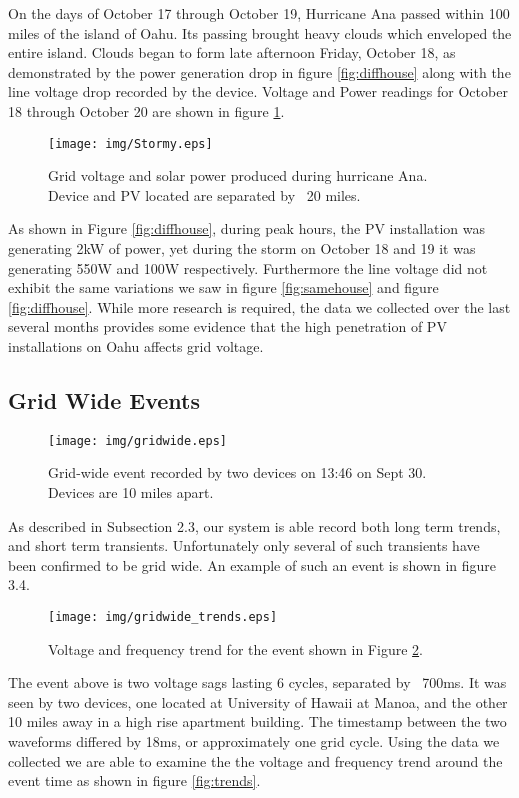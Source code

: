 On the days of October 17 through October 19, Hurricane Ana passed within 100 miles of the island of Oahu. Its passing brought heavy clouds which enveloped the entire island. Clouds began to form late afternoon Friday, October 18, as demonstrated by the power generation drop in figure \ref{fig:diffhouse} along with the line voltage drop recorded by the device. Voltage and Power readings for October 18 through October 20 are shown in figure \ref{fig:storm}.

\begin{figure}[h!]
\centering
\texttt{[image: img/Stormy.eps]}
\caption{Grid voltage and solar power produced during hurricane Ana. Device and PV located are separated by ~20 miles.}
\label{fig:storm}
\end{figure} 

As shown in Figure \ref{fig:diffhouse}, during peak hours, the PV installation was generating 2kW of power, yet during the storm on October 18 and 19 it was generating 550W and 100W respectively. Furthermore the line voltage did not exhibit the same variations we saw in figure \ref{fig:samehouse} and figure \ref{fig:diffhouse}. While more research is required, the data we collected over the last several months provides some evidence that the high penetration of PV installations on Oahu affects grid voltage. 

\subsection{Grid Wide Events}

\begin{figure}[h!]
\centering
\texttt{[image: img/gridwide.eps]}
\caption{Grid-wide event recorded by two devices on 13:46 on Sept 30. Devices are 10 miles apart.}
\label{fig:grid}
\end{figure} 

As described in Subsection 2.3, our system is able record both long term trends, and short term transients. Unfortunately only several of such transients have been confirmed to be grid wide. An example of such an event is shown in figure 3.4.

\begin{figure}[h!]
\centering
\texttt{[image: img/gridwide\_trends.eps]}
\caption{Voltage and frequency trend for the event shown in Figure \ref{fig:grid}.}
\label{fig:daytrends}
\end{figure} 
The event above is two voltage sags lasting 6 cycles, separated by ~700ms. It was seen by two devices, one located at University of Hawaii at Manoa, and the other 10 miles away in a high rise apartment building. The timestamp between the two waveforms differed by 18ms, or approximately one grid cycle. Using the data we collected we are able to examine the the voltage and frequency trend around the event time as shown in figure \ref{fig:trends}.

